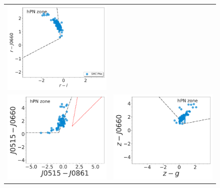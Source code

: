 \documentclass[11pt]{article}
\newcommand\raiselabel[1]{\raisebox{0.9\figwidth}[-0.5\figwidth]{#1}}
\begin{document}
\begin{figure}
\centering
\begin{tabular}{l l}
\includegraphics[width=0.5\linewidth, trim=10 10 10 10, clip]{figs-pca/Fig1-PN-pc-Halpha_emitters_threeerror-cleaning-limfilter-limcolor-flags-mask-broad-vironen.pdf} & \\
 \includegraphics[width=0.5\linewidth, trim=10 10 10 10, clip]{figs-pca/Fig2-PN-pc-Halpha_emitters_threeerror-cleaning-limfilter-limcolor-flags-mask-broad-J0515_J0660.pdf} & \includegraphics[width=0.5\linewidth, trim=10 10 10 10, clip]{figs-pca/Fig3-PN-pc-Halpha_emitters_threeerror-cleaning-limfilter-limcolor-flags-mask-broad-z.pdf} \\

\end{tabular}
\end{figure}
\end{document}

